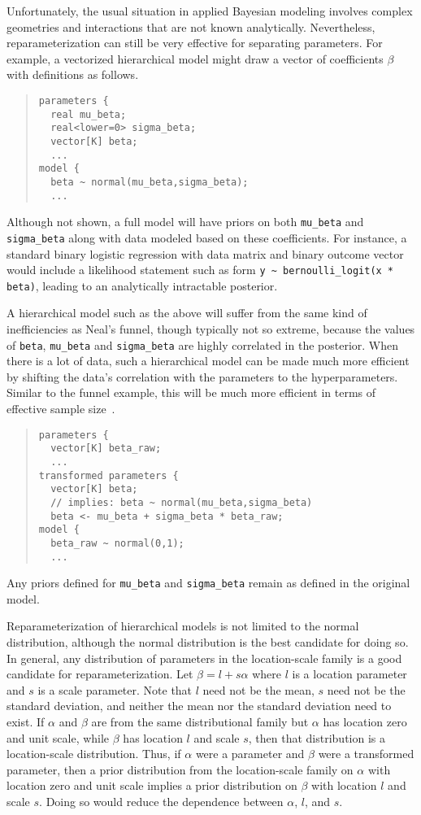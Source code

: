 Unfortunately, the usual situation in applied Bayesian modeling
involves complex geometries and interactions that are not known
analytically.  Nevertheless, reparameterization can still be very
effective for separating parameters.  For example, a vectorized
hierarchical model might draw a vector of coefficients $\beta$ with
definitions as follows.
%
\begin{quote}
\begin{Verbatim}[fontsize=\small]
parameters {
  real mu_beta;   
  real<lower=0> sigma_beta;
  vector[K] beta;
  ...
model {
  beta ~ normal(mu_beta,sigma_beta);
  ...
\end{Verbatim}
\end{quote}
%
Although not shown, a full model will have priors on both
\Verb|mu_beta| and \Verb|sigma_beta| along with data modeled based on
these coefficients.  For instance, a standard binary logistic
regression with data matrix  and binary outcome vector
 would include a likelihood statement such as form
\Verb|y ~ bernoulli_logit(x * beta)|, leading to an analytically
intractable posterior.

A hierarchical model such as the above will suffer from the same kind
of inefficiencies as Neal's funnel, though typically not so extreme,
because the values of \Verb|beta|, \Verb|mu_beta| and
\Verb|sigma_beta| are highly correlated in the posterior. When there is a lot of data, such a
hierarchical model can be made much more efficient by shifting the data's correlation with the 
parameters to the hyperparameters. Similar to the funnel example, this will be much more 
efficient in terms of effective sample size~\citep{Betancourt-Girolami:2013}.
%
\begin{quote}
\begin{Verbatim}[fontsize=\small]
parameters {
  vector[K] beta_raw;
  ...
transformed parameters {
  vector[K] beta;
  // implies: beta ~ normal(mu_beta,sigma_beta)
  beta <- mu_beta + sigma_beta * beta_raw;
model {
  beta_raw ~ normal(0,1);  
  ...
\end{Verbatim}
\end{quote}
%
Any priors defined for \Verb|mu_beta| and \Verb|sigma_beta| remain as
defined in the original model.

Reparameterization of hierarchical models is not limited to the normal
distribution, although the normal distribution is the best candidate
for doing so. In general, any distribution of parameters in the 
location-scale family is a good candidate for reparameterization. Let
$\beta = l + s\alpha$ where $l$ is a location parameter and $s$ is a
scale parameter. Note that $l$ need not be the mean, $s$ need not
be the standard deviation, and neither the mean nor the standard
deviation need to exist. If $\alpha$ and $\beta$ are from the same
distributional family but $\alpha$ has location zero and unit scale, 
while $\beta$ has location $l$ and scale $s$, then that distribution
is a location-scale distribution. Thus, if $\alpha$ were a parameter
and $\beta$ were a transformed parameter, then a prior distribution
from the location-scale family on $\alpha$ with location zero and unit 
scale implies a prior distribution on $\beta$ with location $l$ and
scale $s$. Doing so would reduce the dependence between $\alpha$, 
$l$, and $s$.


